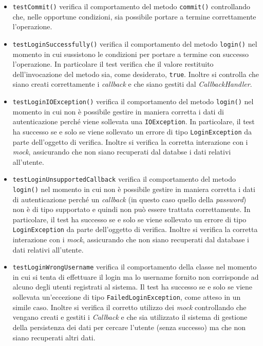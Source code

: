 \begin{itemize}
\begin{itemize}
\item \texttt{testCommit()} verifica il comportamento del metodo \texttt{commit()} controllando che, nelle opportune condizioni, sia possibile portare a termine correttamente l'operazione.

\item \texttt{testLoginSuccessfully()} verifica il comportamento del metodo \texttt{login()} nel momento in cui sussistono le condizioni per portare a termine con successo l'operazione. In particolare il test verifica che il valore restituito dell'invocazione del metodo sia, come desiderato, \texttt{true}. Inoltre si controlla che siano creati correttamente i \textit{callback} e che siano gestiti dal \textit{CallbackHandler}.

\item \texttt{testLoginIOException()} verifica il comportamento del metodo \texttt{login()} nel momento in cui non è possibile gestire in maniera corretta i dati di autenticazione perché viene sollevata una \texttt{IOException}. In particolare, il test ha successo se e solo se viene sollevato un errore di tipo \texttt{LoginException} da parte dell'oggetto di verifica. Inoltre si verifica la corretta interazione con i \textit{mock}, assicurando che non siano recuperati dal databse i dati relativi all'utente.

\item \texttt{testLoginUnsupportedCallback} verifica il comportamento del metodo \texttt{login()} nel momento in cui non è possibile gestire in maniera corretta i dati di autenticazione perché un \textit{callback} (in questo caso quello della \textit{password}) non è di tipo supportato e quindi non può essere trattata correttamente. In particolare, il test ha successo se e solo se viene sollevato un errore di tipo \texttt{LoginException} da parte dell'oggetto di verifica. Inoltre si verifica la corretta interazione con i \textit{mock}, assicurando che non siano recuperati dal database i dati relativi all'utente.

\item \texttt{testLoginWrongUsername} verifica il comportamento della classe nel momento in cui si tenta di effettuare il login ma lo username fornito non corrisponde ad alcuno degli utenti registrati al sistema. Il test ha successo se e solo se viene sollevata un'eccezione di tipo \texttt{FailedLoginException}, come atteso in un simile caso. Inoltre si verifica il corretto utilizzo dei \textit{mock} controllando che vengano creati e gestiti i \textit{Callback} e che sia utilizzato il sistema di gestione della persistenza dei dati per cercare l'utente (senza successo) ma che non siano recuperati altri dati.


\end{itemize}
\end{itemize}
